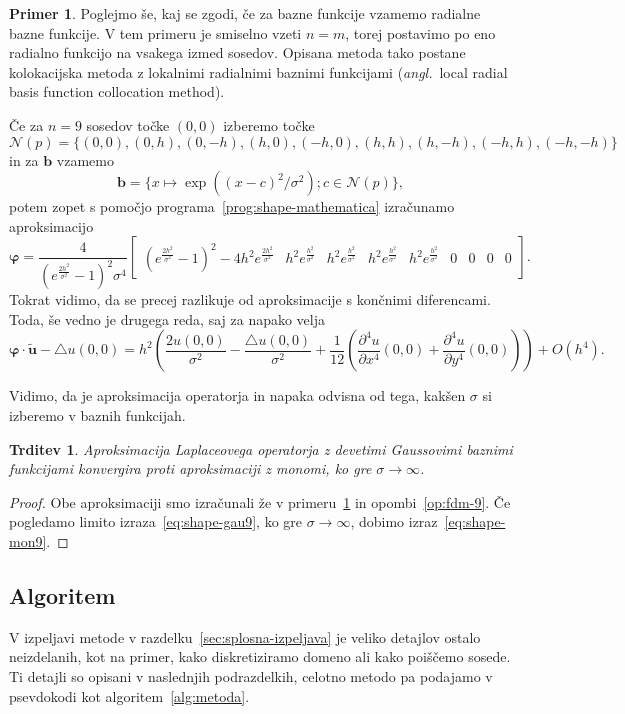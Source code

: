 \documentclass[12pt,a4paper,twoside]{article}
\theoremstyle{definition} %
\newtheorem{primer}[definicija]{Primer}
\theoremstyle{plain} %
\newtheorem{trditev}[definicija]{Trditev}
\numberwithin{equation}{section}
\newcommand{\Nc}{\mathcal{N}}
\newcommand{\lap}{\triangle}
\renewcommand{\b}{\boldsymbol}
\renewcommand{\phi}{\varphi}
\newcommand{\dpar}[2]{\ensuremath{\frac{\partial #1}{\partial #2}}}
\newcommand{\ang}[1]{(\textit{angl.}\ #1)}
\begin{document}
\begin{primer}
\label{prim:rbf}
Poglejmo še, kaj se zgodi, če za bazne funkcije vzamemo radialne bazne funkcije.
V tem primeru je smiselno vzeti $n = m$, torej postavimo po eno radialno funkcijo
na vsakega izmed sosedov. Opisana metoda tako postane kolokacijska metoda z
lokalnimi radialnimi baznimi funkcijami \ang{local radial basis function
collocation method}.

Če za $n = 9$ sosedov točke $(0, 0)$ izberemo točke \[ \Nc(p) = \{
  (0, 0), (0, h), (0, -h), (h, 0), (-h, 0), (h, h), (h, -h), (-h, h), (-h, -h)
\} \] in za $\b b$ vzamemo \[ \b b = \{ x\mapsto \exp((x-c)^2/\sigma^2); c \in \Nc(p)
\}, \]
potem zopet s
pomočjo programa~\ref{prog:shape-mathematica} izračunamo aproksimacijo
\small
\begin{equation}
  \b\phi =\frac{4}{(e^{\frac{2 h^2}{\sigma^2 }}-1)^2 \sigma^4}
\begin{bmatrix}
  (e^{\frac{2 h^2}{\sigma^2 }}-1)^2 -4h^2 e^{\frac{2 h^2}{\sigma^2 }} &
   h^2e^{\frac{h^2}{\sigma^2 }} & h^2e^{\frac{h^2}{\sigma^2 }} &
   h^2e^{\frac{h^2}{\sigma^2 }} & h^2e^{\frac{h^2}{\sigma^2 }} & 0 & 0 & 0 & 0
 \end{bmatrix}.
  \label{eq:shape-gau9}
\end{equation}
\normalsize
Tokrat vidimo, da se precej razlikuje od aproksimacije s končnimi diferencami.
Toda, še vedno je drugega reda, saj za napako velja
\[
  \b \phi\cdot \b{\tilde{u}} - \lap u(0, 0) =
  h^2\left(\frac{2u(0,0)}{\sigma^2} - \frac{\lap u(0,0)}{\sigma^2} +
  \frac{1}{12}\left( \dpar{^4u}{x^4}(0,0) + \dpar{^4u}{y^4}(0, 0) \right)\right)
  + O(h^4).
\]
\end{primer}

Vidimo, da je aproksimacija operatorja in napaka odvisna od tega, kakšen
$\sigma$ si izberemo v baznih funkcijah.
\begin{trditev}
  \label{trd:rbf-konv-k-mon}
  Aproksimacija Laplaceovega operatorja z devetimi Gaussovimi baznimi funkcijami
  konvergira proti aproksimaciji z monomi, ko gre $\sigma \to \infty$.
\end{trditev}
\begin{proof}
  Obe aproksimaciji smo izračunali že v primeru~\ref{prim:rbf} in
  opombi~\ref{op:fdm-9}. Če pogledamo limito izraza~\eqref{eq:shape-gau9},
  ko gre $\sigma \to \infty$, dobimo izraz~\eqref{eq:shape-mon9}.
\end{proof}

\subsection{Algoritem}
V izpeljavi metode v razdelku~\ref{sec:splosna-izpeljava} je veliko detajlov
ostalo neizdelanih, kot na primer, kako diskretiziramo domeno ali kako poiščemo
sosede. Ti detajli so opisani v naslednjih podrazdelkih, celotno metodo pa podajamo v
psevdokodi kot algoritem~\ref{alg:metoda}.
\end{document}
